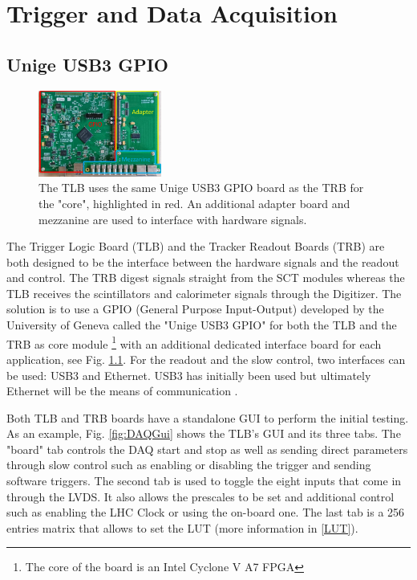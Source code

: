 \chapter{Trigger and Data Acquisition}
\section{Unige USB3 GPIO}

\begin{figure}
\centering    
\includegraphics[width=0.36\textwidth]{ChapterDAQ/Figs/GeneralDAQ/UnigeUSB3GPIO.jpg}
\caption[Unige USB3 GPIO]{The TLB uses the same Unige USB3 GPIO board as the TRB for the "core", highlighted in red. An additional adapter board and mezzanine are used to interface with hardware signals.}
\label{fig:UnigeUSB3GPIO}
\end{figure}

The Trigger Logic Board (TLB) and the Tracker Readout Boards (TRB) are both designed to be the interface between the hardware signals and the readout and control. The TRB digest signals straight from the SCT modules whereas the TLB receives the scintillators and calorimeter signals through the Digitizer. The solution is to use a GPIO (General Purpose Input-Output) developed by the University of Geneva called the "Unige USB3 GPIO" for both the TLB and the TRB as core module \footnote{The core of the board is an Intel Cyclone V A7 FPGA} with an additional dedicated interface board for each application, see Fig. \ref{fig:UnigeUSB3GPIO}. For the readout and the slow control, two interfaces can be used: USB3 and Ethernet. USB3 has initially been used but ultimately Ethernet will be the means of communication \cite{faser_collaboration_technical_2018}.


Both TLB and TRB boards have a standalone GUI to perform the initial testing. As an example, Fig. \ref{fig:DAQGui} shows the TLB's GUI and its three tabs. The "board" tab controls the DAQ start and stop as well as sending direct parameters through slow control such as enabling or disabling the trigger and sending software triggers. The second tab is used to toggle the eight inputs that come in through the LVDS. It also allows the prescales to be set and additional control such as enabling the LHC Clock or using the on-board one.  The last tab is a 256 entries matrix that allows to set the LUT (more information in \ref{LUT}).


